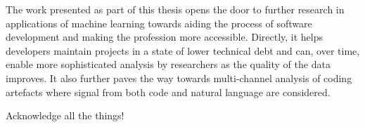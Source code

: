 \begin{impactstatement}
The work presented as part of this thesis opens the door to further research in applications of machine learning towards aiding the process of software development and making the profession more accessible. Directly, it helps developers maintain projects in a state of lower technical debt and can, over time, enable more sophisticated analysis by researchers as the quality of the data improves. It also further paves the way towards multi-channel analysis of coding artefacts where signal from both code and natural language are considered. 
\end{impactstatement}

\begin{acknowledgements}
Acknowledge all the things!
\end{acknowledgements}

\setcounter{tocdepth}{2} 

\tableofcontents
\listoffigures
\listoftables

